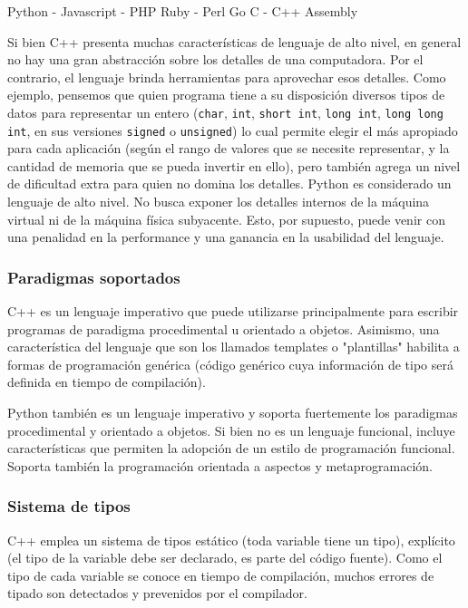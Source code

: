 \documentclass[]{article}
\begin{document}

Python - Javascript - PHP
Ruby - Perl
Go
C - C++
Assembly

Si bien C++ presenta muchas características de lenguaje de alto nivel, en
general no hay una gran abstracción sobre los detalles de una computadora. Por
el contrario, el lenguaje brinda herramientas para aprovechar esos detalles.
Como ejemplo, pensemos que quien programa tiene a su disposición diversos tipos
de datos para representar un entero (\verb!char!, \verb!int!, \verb!short int!,
\verb!long int!, \verb!long long int!, en sus versiones \verb!signed! o
\verb!unsigned!) lo cual permite elegir el más apropiado para cada aplicación
(según el rango de valores que se necesite representar, y la cantidad de
memoria que se pueda invertir en ello), pero también agrega un nivel de
dificultad extra para quien no domina los detalles. Python es considerado un
lenguaje de alto nivel. No busca exponer los detalles internos de la máquina
virtual ni de la máquina física subyacente. Esto, por supuesto, puede venir con
una penalidad en la performance y una ganancia en la usabilidad del lenguaje.

\subsubsection{Paradigmas soportados}

C++ es un lenguaje imperativo que puede utilizarse principalmente para escribir
programas de paradigma procedimental u orientado a objetos. Asimismo, una
característica del lenguaje que son los llamados templates o "plantillas"
habilita a formas de programación genérica (código genérico cuya información de
tipo será definida en tiempo de compilación).

Python también es un lenguaje imperativo y soporta fuertemente los paradigmas
procedimental y orientado a objetos. Si bien no es un lenguaje funcional,
incluye características que permiten la adopción de un estilo de programación
funcional. Soporta también la programación orientada a aspectos y
metaprogramación.

\subsubsection{Sistema de tipos}

C++ emplea un sistema de tipos estático (toda variable tiene un tipo),
explícito (el tipo de la variable debe ser declarado, es parte del código
fuente). Como el tipo de cada variable se conoce en tiempo de compilación,
muchos errores de tipado son detectados y prevenidos por el compilador.
\end{document}
